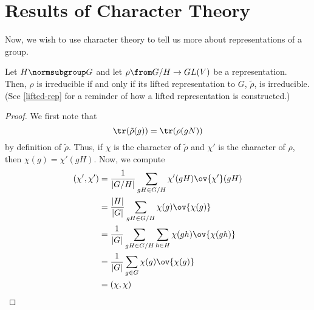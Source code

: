 \documentclass[11pt,leqno,oneside]{amsbook}
\numberwithin{thm}{section}
\begin{document}
\section{Results of Character Theory}
Now, we wish to use character theory to tell us more about
representations of a group. 
\begin{prop}
  Let \(H \normsubgroup G\) and let \(\rho \from G/H \to GL(V)\) be a
  representation. Then, \(\rho\) is irreducible if and only if its
  lifted representation to \(G\), \(\tilde{\rho}\), is
  irreducible. (See \ref{lifted-rep} for a reminder of how a lifted
  representation is constructed.)
\end{prop}
\begin{proof}
  We first note that \[
    \tr(\tilde{\rho}(g)) = \tr(\rho(gN))
  \]
  by definition of \(\tilde{\rho}\). Thus, if \(\chi\) is the
  character of \(\tilde{\rho}\) and \(\chi'\) is the character of
  \(\rho\), then \(\chi(g) = \chi'(gH)\). Now, we compute
  \begin{align*}
    (\chi', \chi') & = \frac{1}{|G/H|} \sum_{gH \in G/H} \chi'(gH)
                     \ov{\chi'}(gH) \\
                   & = \frac{|H|}{|G|} \sum_{gH \in G/H} \chi(g) \ov{\chi(g)} \\
    & = \frac{1}{|G|} \sum_{gH \in G/H} \sum_{h \in H} \chi(gh)
      \ov{\chi(gh)} \\
                   & = \frac{1}{|G|} \sum_{g \in G} \chi(g) \ov{\chi(g)} \\
    & = (\chi, \chi)
  \end{align*}
\end{proof}
\end{document}
